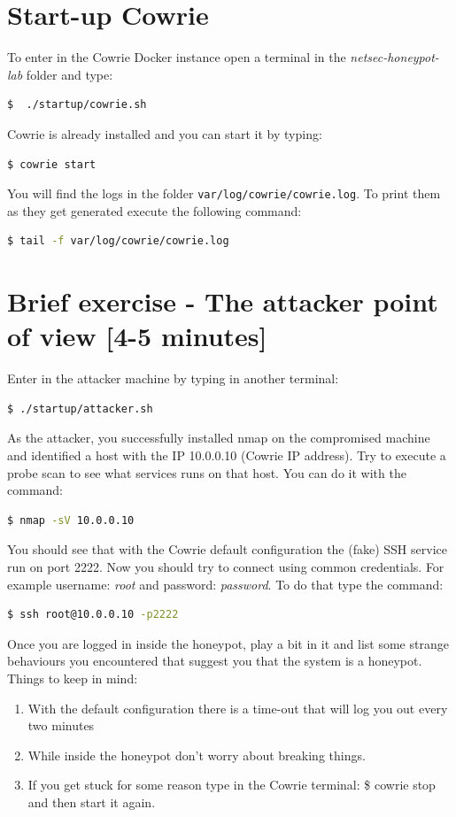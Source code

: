 \documentclass[epsfig,a4paper,11pt,titlepage,oneside,openany]{book}
\begin{document}
\section{Start-up Cowrie}
To enter in the Cowrie Docker instance open a terminal in the \textit{netsec-honeypot-lab} folder and type:
\begin{lstlisting}[language=bash]
$  ./startup/cowrie.sh
\end{lstlisting}
Cowrie is already installed and you can start it by typing:
\begin{lstlisting}[language=bash]
$ cowrie start
\end{lstlisting}
You will find the logs in the folder \texttt{var/log/cowrie/cowrie.log}. To print them as they get generated execute the following command:
\begin{lstlisting}[language=bash]
$ tail -f var/log/cowrie/cowrie.log
\end{lstlisting}

\section{Brief exercise - The attacker point of view [4-5 minutes]}
Enter in the attacker machine by typing in another terminal:
\begin{lstlisting}[language=bash]
$ ./startup/attacker.sh
\end{lstlisting}
As the attacker, you successfully installed nmap on the compromised machine and identified a host with the IP 10.0.0.10 (Cowrie IP address). Try to execute a probe scan to see what services runs on that host. You can do it with the command:
\begin{lstlisting}[language=bash]
$ nmap -sV 10.0.0.10
\end{lstlisting}
You should see that with the Cowrie default configuration the (fake) SSH service run on port 2222.
Now you should try to connect using common credentials. For example username: \textit{root} and password: \textit{password}. To do that type the command:
\begin{lstlisting}[language=bash]
$ ssh root@10.0.0.10 -p2222
\end{lstlisting}
Once you are logged in inside the honeypot, play a bit in it and list some strange behaviours you encountered that suggest you that the system is a honeypot.
Things to keep in mind:
\begin{enumerate}
\itemsep0em 
\item With the default configuration there is a time-out that will log you out every two minutes
\item While inside the honeypot don't worry about breaking things.
\item If you get stuck for some reason type in the Cowrie terminal: \$ cowrie stop and then start it again.
\end{enumerate}
\end{document}

